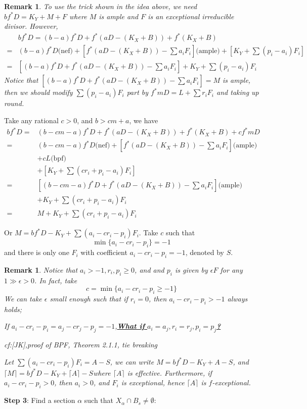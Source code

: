 \documentclass{article}
\newtheorem{rmk}[defn]{Remark}
\begin{document}
\begin{rmk}
  To use the trick shown in the idea above, we need $ bf^*D=K_Y+M+F $ where $ M $ is ample and $ F $ is an exceptional irreducible divisor. However, 
  \begin{equation*}
  \begin{aligned}
  &bf^*D=(b-a)f^*D+f^*(aD-(K_X+B))+f^*(K_X+B)\\
  =&(b-a)f^*D\text{(nef)}+[f^*(aD-(K_X+B))-\sum a_iF_i]\text{(ample)}+[K_Y+\sum (p_i-a_i)F_i]\\
  =&[(b-a)f^*D+f^*(aD-(K_X+B))-\sum a_iF_i]+K_Y+\sum (p_i-a_i)F_i
  \end{aligned}
  \end{equation*}
  Notice that $ [(b-a)f^*D+f^*(aD-(K_X+B))-\sum a_iF_i]=M $ is ample, then we should modify $ \sum (p_i-a_i)F_i $ part by $ f^*mD=L+\sum r_iF_i $ and taking up round.
\end{rmk}

Take any rational $ c>0 $, and $ b>cm+a $, we have 
\begin{equation*}
\begin{aligned}
bf^*D=&(b-cm-a)f^*D+f^*(aD-(K_X+B))+f^*(K_X+B)+cf^*mD\\
=&(b-cm-a)f^*D\text{(nef)}+[f^*(aD-(K_X+B))-\sum a_iF_i]\text{(ample)}\\
&+cL\text{(bpf)}\\
&+[K_Y+\sum (cr_i+p_i-a_i)F_i]\\
=&[(b-cm-a)f^*D+f^*(aD-(K_X+B))-\sum a_iF_i]\text{(ample)}\\
&+K_Y+\sum (cr_i+p_i-a_i)F_i\\
=&M+K_Y+\sum(cr_i+p_i-a_i)F_i
\end{aligned}
\end{equation*} 

Or $ M=bf^*D-K_Y+\sum (a_i-cr_i-p_i)F_i $. Take $ c $ such that 
\[ \min\{ a_i-cr_i-p_i \}=-1 \]
 and there is only one $ F_i $ with coefficient $ a_i-cr_i-p_i=-1 $, denoted by $ S $.
 \begin{rmk}
  Notice that $ a_i>-1, r_i,p_i\geqslant0 $, and and $ p_i $ is given by $ \epsilon F $ for any $ 1\gg \epsilon>0 $. In fact, take 
  \[ c=\min\{  a_i-cr_i-p_i\geqslant -1\} \]
  We can take $ \epsilon $ small enough such that if $ r_i=0 $, then $ a_i-cr_i-p_i>-1 $ always holds; 
  
  If $ a_i-cr_i-p_i=a_j-cr_j-p_j=-1 $,\underline{\textbf{What if } $ a_i=a_j,r_i=r_j,p_i=p_j $\textbf{?}}
  
  cf:[JK],proof of BPF, Theorem 2.1.1, \textit{tie breaking}
  
  Let $ \sum (a_i-cr_i-p_i)F_i=A-S $, we can write $ M=bf^*D-K_Y+A-S $, and $ \lceil M\rceil =bf^*D-K_Y+\lceil A\rceil-S $where $ \lceil A\rceil $ is effective. Furthermore, if $ a_i-cr_i-p_i>0 $, then $ a_i>0 $, and $ F_i $ is exceptional, hence $ \lceil A\rceil $ is $ f $-exceptional. 
 \end{rmk}
\textbf{Step 3}: Find a section $ \alpha $ such that $ X_\alpha\cap B_s\neq \emptyset  $:
\end{document}
